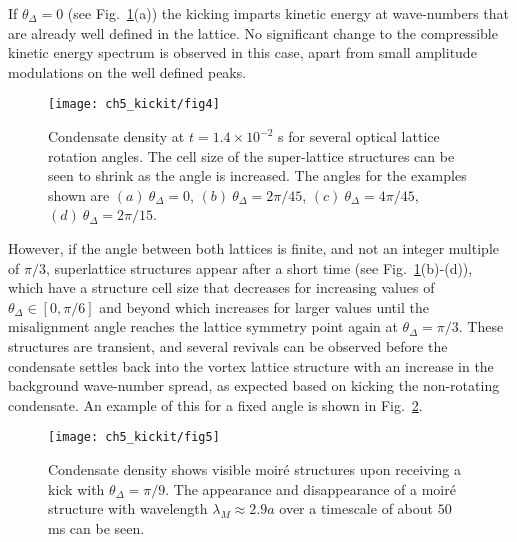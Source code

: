    If $\theta_\Delta=0$ (see Fig.~\ref{fig:moire_density}(a)) the kicking imparts kinetic energy at wave-numbers that are already well defined in the lattice. No significant change to the compressible kinetic energy spectrum is observed in this case, apart from small amplitude modulations on the well defined peaks.

	\begin{figure}
        \centering
			\texttt{[image: ch5\_kickit/fig4]}
			\caption[Effect of kicking on condensate with a large vortex lattice.]{Condensate density at $t=1.4\times10^{-2}$ s for several optical lattice rotation angles. The cell size of the super-lattice structures can be seen to shrink as the angle is increased. The angles for the examples shown are $(a)~\theta_\Delta=0$, $(b)~\theta_\Delta=2\pi/45$, $(c)~\theta_\Delta=4\pi/45$, $(d)~\theta_\Delta=2\pi/15$. }
			\label{fig:moire_density}
		\end{figure}

    However, if the angle between both lattices is finite, and not an integer multiple of $\pi/3$, superlattice structures appear after a short time (see Fig.~\ref{fig:moire_density}(b)-(d)), which have a structure cell size that decreases for increasing values of $\theta_\Delta\in[0,\pi/6]$ and beyond which increases for larger values until the misalignment angle reaches the lattice symmetry point again at $\theta_\Delta=\pi/3$. These structures are transient, and several revivals can be observed before the condensate settles back into the vortex lattice structure with an increase in the background wave-number spread, as expected based on kicking the non-rotating condensate. An example of this for a fixed angle is shown in Fig.~\ref{fig:dtheta20_ev}.

	\begin{figure}
        \centering
		\texttt{[image: ch5\_kickit/fig5]}
		\caption[Oscillation of moir\'e wavelength.]{Condensate density shows visible moir\'e structures upon receiving a kick with $\theta_\Delta=\pi/9$. The appearance and disappearance of a moir\'e structure with wavelength $\lambda_M \approx 2.9 a$ over a timescale of about $50$ ms can be seen.}
		\label{fig:dtheta20_ev}
	\end{figure}

